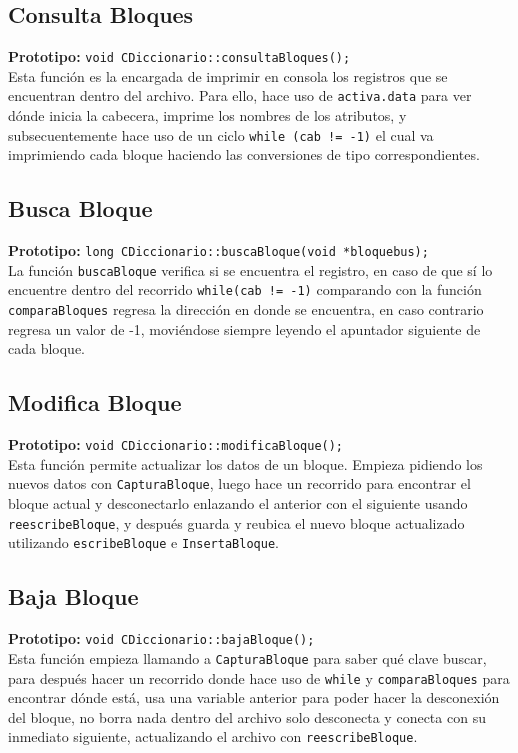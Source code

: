 \documentclass[12pt]{article}
\begin{document}
{}
\subsection*{Consulta Bloques}
\textbf{Prototipo:} \verb|void CDiccionario::consultaBloques();|\\
Esta función es la encargada de imprimir en consola los 
registros que se encuentran dentro del archivo. Para ello, 
hace uso de \verb|activa.data| para ver dónde inicia la cabecera, 
imprime los nombres de los atributos, y subsecuentemente hace 
uso de un ciclo \verb|while (cab != -1)| el cual va imprimiendo 
cada bloque haciendo las conversiones de tipo correspondientes.

{}
\subsection*{Busca Bloque}
\textbf{Prototipo:} \verb|long CDiccionario::buscaBloque(void *bloquebus);|\\
La función \verb|buscaBloque| verifica si se encuentra el registro, 
en caso de que sí lo encuentre dentro del recorrido 
\verb|while(cab != -1)| comparando con la función 
\verb|comparaBloques| regresa la dirección en donde se encuentra, 
en caso contrario regresa un valor de -1, moviéndose siempre 
leyendo el apuntador siguiente de cada bloque.

{}
\subsection*{Modifica Bloque}
\textbf{Prototipo:} \verb|void CDiccionario::modificaBloque();|\\
Esta función permite actualizar los datos de un bloque. 
Empieza pidiendo los nuevos datos con \verb|CapturaBloque|, 
luego hace un recorrido para encontrar el bloque actual y 
desconectarlo enlazando el anterior con el siguiente 
usando \verb|reescribeBloque|, y después guarda y 
reubica el nuevo bloque actualizado utilizando 
\verb|escribeBloque| e \verb|InsertaBloque|.

{}
\subsection*{Baja Bloque}
\textbf{Prototipo:} \verb|void CDiccionario::bajaBloque();|\\
Esta función empieza llamando a \verb|CapturaBloque| para saber 
qué clave buscar, para después hacer un recorrido donde hace uso 
de \verb|while| y \verb|comparaBloques| para encontrar dónde 
está, usa una variable anterior para poder hacer la desconexión 
del bloque, no borra nada dentro del archivo solo desconecta y 
conecta con su inmediato siguiente, actualizando el archivo con 
\verb|reescribeBloque|.
\end{document}
